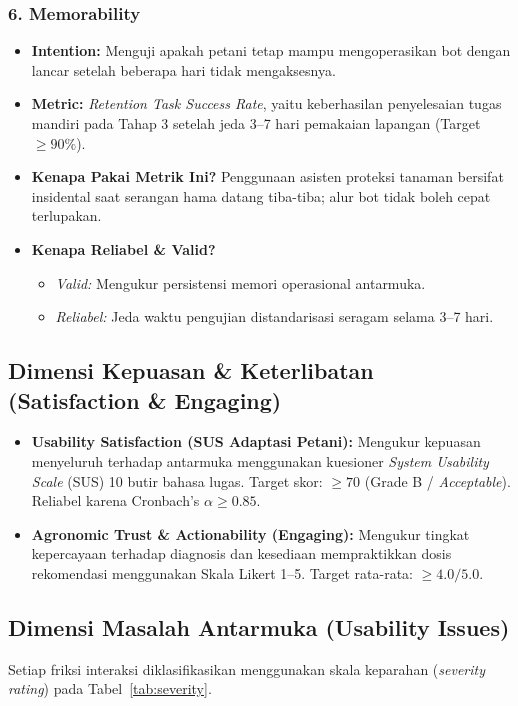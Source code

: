 \documentclass[11pt,a4paper]{article}
\begin{document}
\subsubsection{6. Memorability}
\begin{itemize}[noitemsep]
    \item \textbf{Intention:} Menguji apakah petani tetap mampu mengoperasikan bot dengan lancar setelah beberapa hari tidak mengaksesnya.
    \item \textbf{Metric:} \textit{Retention Task Success Rate}, yaitu keberhasilan penyelesaian tugas mandiri pada Tahap 3 setelah jeda 3--7 hari pemakaian lapangan (Target $\ge 90\%$).
    \item \textbf{Kenapa Pakai Metrik Ini?} Penggunaan asisten proteksi tanaman bersifat insidental saat serangan hama datang tiba-tiba; alur bot tidak boleh cepat terlupakan.
    \item \textbf{Kenapa Reliabel \& Valid?}
    \begin{itemize}[noitemsep]
        \item \textit{Valid:} Mengukur persistensi memori operasional antarmuka.
        \item \textit{Reliabel:} Jeda waktu pengujian distandarisasi seragam selama 3--7 hari.
    \end{itemize}
\end{itemize}

\subsection{Dimensi Kepuasan \& Keterlibatan (Satisfaction \& Engaging)}
\begin{itemize}[noitemsep]
    \item \textbf{Usability Satisfaction (SUS Adaptasi Petani):} Mengukur kepuasan menyeluruh terhadap antarmuka menggunakan kuesioner \textit{System Usability Scale} (SUS) 10 butir bahasa lugas. Target skor: $\ge 70$ (Grade B / \textit{Acceptable}). Reliabel karena Cronbach's $\alpha \ge 0.85$.
    \item \textbf{Agronomic Trust \& Actionability (Engaging):} Mengukur tingkat kepercayaan terhadap diagnosis dan kesediaan mempraktikkan dosis rekomendasi menggunakan Skala Likert 1--5. Target rata-rata: $\ge 4.0 / 5.0$.
\end{itemize}

\subsection{Dimensi Masalah Antarmuka (Usability Issues)}
Setiap friksi interaksi diklasifikasikan menggunakan skala keparahan (\textit{severity rating}) pada Tabel~\ref{tab:severity}.
\end{document}
